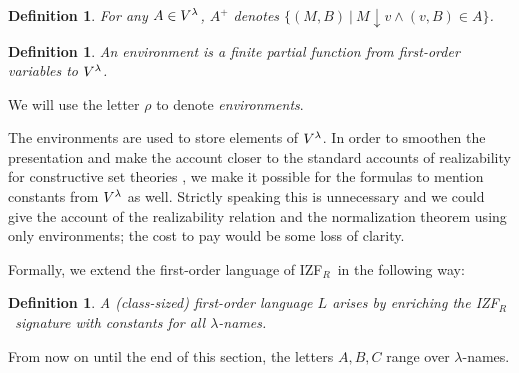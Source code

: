 \documentclass{LMCS}
\newtheorem{definition}[thm]{Definition}
\newcommand{\izfr}{IZF${}_R$}
\begin{document}
\begin{definition}
For any $A \in V^{\lambda}$, $A^+$ denotes $\{ (M, B)\ |\ M \downarrow v \land (v,
B) \in A \}$. 
\end{definition}

\begin{definition}
An \emph{environment} is a finite partial function from first-order
variables to $V^{\lambda}$. 
\end{definition}
We will use the letter $\rho$ to denote \emph{environments}.

The environments are used to store elements of $V^{\lambda}$. In order to smoothen the
presentation and make the account closer to the standard accounts of realizability for constructive set theories
\cite{mccarty,rathjendp,rathjenizf}, we make it possible for the formulas to mention constants 
from $V^{\lambda}$ as well. Strictly speaking this is unnecessary and we could give
the account of the realizability relation and the normalization theorem using
only environments; the cost to pay would be some loss of clarity.

Formally, we extend the first-order language of \izfr\ in the following way:

\begin{definition}
A (class-sized) first-order language $L$ arises by enriching the \izfr\ signature
with constants for all $\lambda$-names.
\end{definition}

From now on until the end of this section, the letters $A, B, C$ range over $\lambda$-names. 
\end{document}
